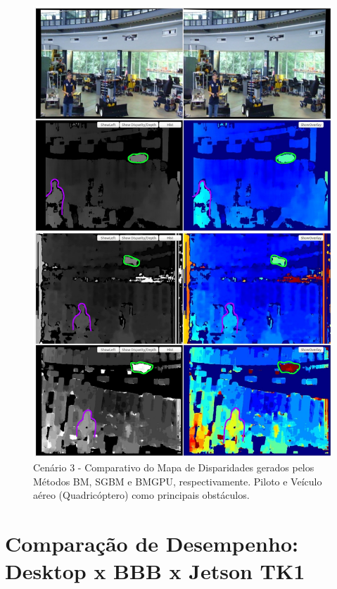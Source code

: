 \begin{figure}[H]
 	\centering
 	\includegraphics[scale=0.35]{./Resources/results/scene3_montage_highlighted.jpg}
 	\caption{Cenário 3 - Comparativo do Mapa de Disparidades gerados pelos Métodos BM, SGBM e BMGPU, respectivamente. Piloto e Veículo aéreo (Quadricóptero) como principais obstáculos.}
 	\label{scene3_montage}
\end{figure}

\section{Comparação de Desempenho: Desktop x BBB x Jetson TK1}
\label{resultsComparison}

